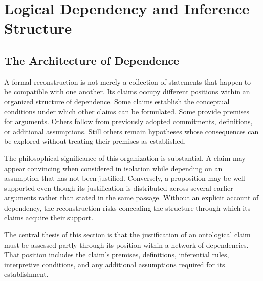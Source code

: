 
\section{Logical Dependency and Inference Structure}
\label{sec:logical-dependency-and-inference-structure}

\subsection{The Architecture of Dependence}

A formal reconstruction is not merely a collection of statements
that happen to be compatible with one another. Its claims occupy
different positions within an organized structure of dependence.
Some claims establish the conceptual conditions under which other
claims can be formulated. Some provide premises for arguments.
Others follow from previously adopted commitments, definitions,
or additional assumptions. Still others remain hypotheses whose
consequences can be explored without treating their premises as
established.

The philosophical significance of this organization is substantial.
A claim may appear convincing when considered in isolation while
depending on an assumption that has not been justified. Conversely,
a proposition may be well supported even though its justification
is distributed across several earlier arguments rather than stated
in the same passage. Without an explicit account of dependency,
the reconstruction risks concealing the structure through which
its claims acquire their support.

The central thesis of this section is that the justification of
an ontological claim must be assessed partly through its position
within a network of dependencies. That position includes the
claim's premises, definitions, inferential rules, interpretive
conditions, and any additional assumptions required for its
establishment.

